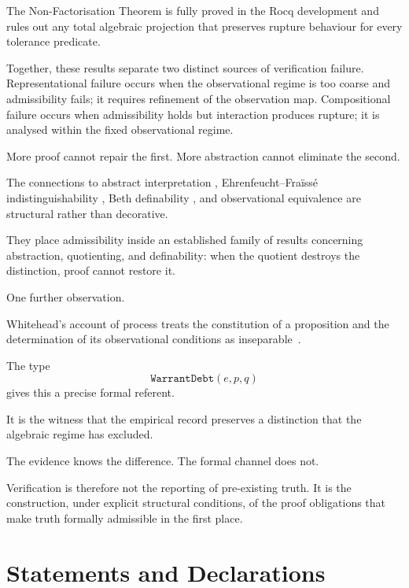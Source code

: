 \documentclass[12pt]{article}
\theoremstyle{plain}
\theoremstyle{definition}
\theoremstyle{remark}
\begin{document}
The Non-Factorisation Theorem is fully proved in the Rocq development
and rules out any total algebraic projection that preserves rupture
behaviour for every tolerance predicate.

Together, these results separate two distinct sources of verification
failure.
Representational failure occurs when the observational regime is too
coarse and admissibility fails; it requires refinement of the
observation map.
Compositional failure occurs when admissibility holds but interaction
produces rupture; it is analysed within the fixed observational regime.

More proof cannot repair the first.
More abstraction cannot eliminate the second.

The connections to abstract interpretation
\cite{cousot1977,cousot1979},
Ehrenfeucht--Fra\"{i}ss\'{e} indistinguishability
\cite{ehrenfeucht1961,libkin2004},
Beth definability
\cite{beth1953,hodges1993},
and observational equivalence
\cite{milner1980,milner1989}
are structural rather than decorative.

They place admissibility inside an established family of results
concerning abstraction, quotienting, and definability: when the
quotient destroys the distinction, proof cannot restore it.

One further observation.

Whitehead's account of process treats the constitution of a proposition
and the determination of its observational conditions as
inseparable~\cite{whitehead1929}.

The type
\[
\texttt{WarrantDebt}(e,p,q)
\]
gives this a precise formal referent.

It is the witness that the empirical record preserves a distinction
that the algebraic regime has excluded.

The evidence knows the difference.
The formal channel does not.

Verification is therefore not the reporting of pre-existing truth.
It is the construction, under explicit structural conditions, of the
proof obligations that make truth formally admissible in the first
place.

\section*{Statements and Declarations}
\end{document}
